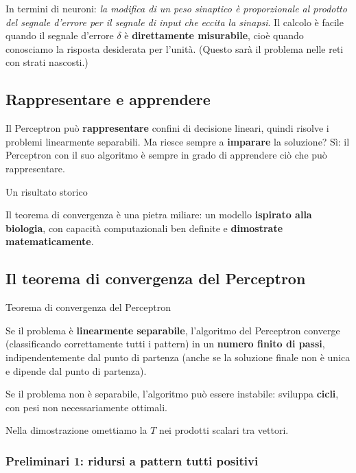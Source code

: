 In termini di neuroni: \emph{la modifica di un peso sinaptico è
proporzionale al prodotto del segnale d'errore per il segnale di input
che eccita la sinapsi}. Il calcolo è facile quando il segnale d'errore
\(\delta\) è \textbf{direttamente misurabile}, cioè quando conosciamo la
risposta desiderata per l'unità. (Questo sarà il problema nelle reti con
strati nascosti.)

\subsection{Rappresentare e
apprendere}\label{rappresentare-e-apprendere}

Il Perceptron può \textbf{rappresentare} confini di decisione lineari,
quindi risolve i problemi linearmente separabili. Ma riesce sempre a
\textbf{imparare} la soluzione? Sì: il Perceptron con il suo algoritmo è
sempre in grado di apprendere ciò che può rappresentare.

\begin{boxnote}{Un risultato storico}

Il teorema di convergenza è una pietra miliare: un modello
\textbf{ispirato alla biologia}, con capacità computazionali ben
definite e \textbf{dimostrate matematicamente}.

\end{boxnote}

\subsection{Il teorema di convergenza del
Perceptron}\label{il-teorema-di-convergenza-del-perceptron}

\begin{boxtheorem}{Teorema di convergenza del Perceptron}

Se il problema è \textbf{linearmente separabile}, l'algoritmo del
Perceptron converge (classificando correttamente tutti i pattern) in un
\textbf{numero finito di passi}, indipendentemente dal punto di partenza
(anche se la soluzione finale non è unica e dipende dal punto di
partenza).

Se il problema non è separabile, l'algoritmo può essere instabile:
sviluppa \textbf{cicli}, con pesi non necessariamente ottimali.

\end{boxtheorem}

Nella dimostrazione omettiamo la \(T\) nei prodotti scalari tra vettori.

\subsubsection{Preliminari 1: ridursi a pattern tutti
positivi}\label{preliminari-1-ridursi-a-pattern-tutti-positivi}

